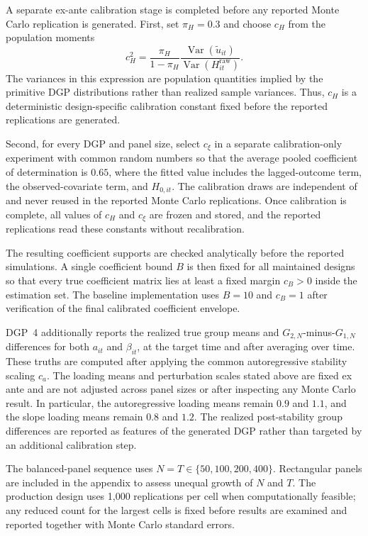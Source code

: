 \documentclass[11pt]{article}
\numberwithin{equation}{section}
\theoremstyle{remark}
\begin{document}
A separate ex-ante calibration stage is completed before any reported Monte Carlo replication is generated. First, set $\pi_H=0.3$ and choose $c_H$ from the population moments
$$
c_H^2
=
\frac{\pi_H}{1-\pi_H}
\frac{\operatorname{Var}(\widetilde u_{it})}
{\operatorname{Var}(H_{it}^{\mathrm{raw}})}.
$$
The variances in this expression are population quantities implied by the primitive DGP distributions rather than realized sample variances. Thus, $c_H$ is a deterministic design-specific calibration constant fixed before the reported replications are generated.

Second, for every DGP and panel size, select $c_\xi$ in a separate calibration-only experiment with common random numbers so that the average pooled coefficient of determination is $0.65$, where the fitted value includes the lagged-outcome term, the observed-covariate term, and $H_{0,it}$. The calibration draws are independent of and never reused in the reported Monte Carlo replications. Once calibration is complete, all values of $c_H$ and $c_\xi$ are frozen and stored, and the reported replications read these constants without recalibration.

The resulting coefficient supports are checked analytically before the reported simulations. A single coefficient bound $B$ is then fixed for all maintained designs so that every true coefficient matrix lies at least a fixed margin $c_B>0$ inside the estimation set. The baseline implementation uses $B=10$ and $c_B=1$ after verification of the final calibrated coefficient envelope.

DGP~4 additionally reports the realized true group means and $G_{2,N}$-minus-$G_{1,N}$ differences for both $a_{it}$ and $\beta_{it}$, at the target time and after averaging over time. These truths are computed after applying the common autoregressive stability scaling $c_a$. The loading means and perturbation scales stated above are fixed ex ante and are not adjusted across panel sizes or after inspecting any Monte Carlo result. In particular, the autoregressive loading means remain $0.9$ and $1.1$, and the slope loading means remain $0.8$ and $1.2$. The realized post-stability group differences are reported as features of the generated DGP rather than targeted by an additional calibration step.

The balanced-panel sequence uses $N=T\in\{50,100,200,400\}$. Rectangular panels are included in the appendix to assess unequal growth of $N$ and $T$. The production design uses 1,000 replications per cell when computationally feasible; any reduced count for the largest cells is fixed before results are examined and reported together with Monte Carlo standard errors.
\end{document}
